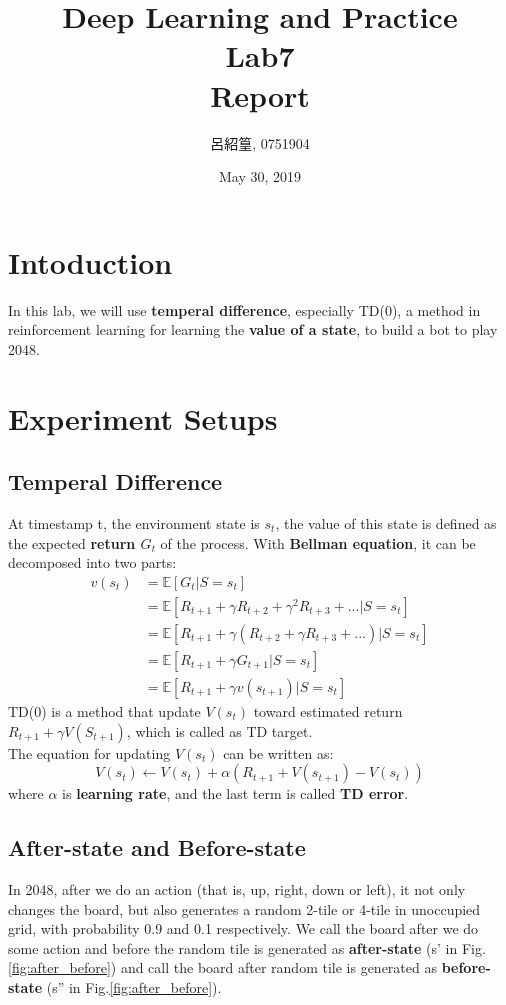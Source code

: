 \documentclass[12pt,a4paper]{article}
\title{Deep Learning and Practice \\Lab7 \\ Report}
\date{May 30, 2019}
\author{呂紹篁, 0751904}
\begin{document}
\thispagestyle{plain}
\cfoot{}
\maketitle

\section{Intoduction} \label{sec:intro}
In this lab, we will use \textbf{temperal difference}, especially TD(0), a method in reinforcement learning 
for learning the \textbf{value of a state}, to build a bot to play 2048.

\section{Experiment Setups} \label{sec:exp_setup}
\subsection{Temperal Difference}
At timestamp t, the environment state is $s_t$, the value of this state is defined as the expected \textbf{return $G_t$} of the process. 
With \textbf{Bellman equation}, it can be decomposed into two parts: \\ 
\begin{equation}
\begin{split}
v(s_t) & = \mathbb{E}[G_t|S=s_t] \\
       & = \mathbb{E}[R_{t+1}+\gamma R_{t+2}+\gamma^2 R_{t+3}+...|S=s_t] \\
       & = \mathbb{E}[R_{t+1}+\gamma (R_{t+2}+\gamma R_{t+3}+...)|S=s_t] \\
       & = \mathbb{E}[R_{t+1}+\gamma G_{t+1}|S=s_t] \\
       & = \mathbb{E}[R_{t+1}+\gamma v(s_{t+1})|S=s_t]
\end{split}
\end{equation}
TD(0) is a method that update $V(s_t)$ toward estimated return $R_{t+1}+\gamma V(S_{t+1})$, which is called as TD target. \\
The equation for updating $V(s_t)$ can be written as:
\begin{equation}
V(s_t) \leftarrow V(s_t) + \alpha (R_{t+1}+V(s_{t+1})-V(s_t))
\end{equation}
where $\alpha$ is \textbf{learning rate}, and the last term is called 
\textbf{TD error}.
\subsection{After-state and Before-state}
In 2048, after we do an action (that is, up, right, down or left), it not only changes the board, but also 
generates a random 2-tile or 4-tile in unoccupied grid, with probability 0.9 and 0.1
respectively. We call the board after we do some action and before the random tile
is generated as \textbf{after-state} (s' in Fig.\ref{fig:after_before}) and call the board after random tile is 
generated as \textbf{before-state} (s'' in Fig.\ref{fig:after_before}).
\end{document}
